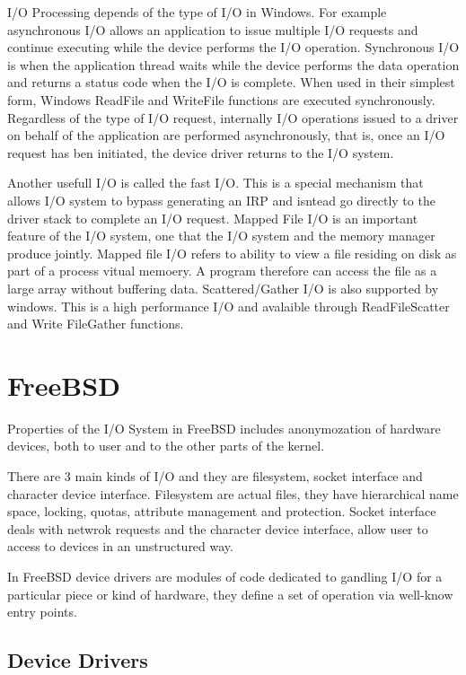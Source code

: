 \documentclass[letterpaper,10pt,draftclsnofoot,onecolumn]{IEEEtran}
\begin{document}
I/O Processing depends of the type of I/O in Windows. For example asynchronous I/O allows an application to issue multiple I/O requests and continue executing while the device performs the I/O operation. Synchronous I/O is when the application thread waits while the device performs the data operation and returns a status code when the I/O is complete. When used in their simplest form, Windows ReadFile and WriteFile functions are executed synchronously. Regardless of the type of I/O request, internally I/O operations issued to a driver on behalf of the application are performed asynchronously, that is, once an I/O request has ben initiated, the device driver returns to the I/O system.

Another usefull I/O is called the fast I/O. This is a special mechanism that allows I/O system to bypass generating an IRP and isntead go directly to the driver stack to complete an I/O request. Mapped File I/O is an important feature of the I/O system, one that the I/O system and the memory manager produce jointly. Mapped file I/O refers to ability to view a file residing on disk as part of a process vitual memoery. A program therefore can access the file as a large array without buffering data. Scattered/Gather I/O is also supported by windows. This is a high performance I/O and avalaible through ReadFileScatter and Write FileGather functions.




\section*{FreeBSD}

Properties of the I/O System in FreeBSD includes anonymozation of hardware devices, both to user and to the other parts of the kernel. 

There are 3 main kinds of I/O and they are filesystem, socket interface and character device interface. Filesystem are actual files, they have hierarchical name space, locking, quotas, attribute management and protection. Socket interface deals with netwrok requests and the character device interface, allow user to access to devices in an unstructured way.

In FreeBSD device drivers are modules of code dedicated to gandling I/O for a particular piece or kind of hardware, they define a set of operation via well-know entry points.

\subsection{Device Drivers}
\end{document}
